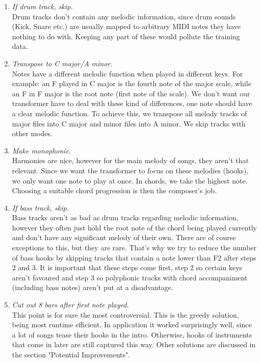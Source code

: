 \documentclass[a4paper,12pt]{extarticle}
\begin{document}
\begin{enumerate}
    \item \textit{If drum track, skip.} \\[0.2cm]
    Drum tracks don't contain any melodic information, since drum sounds (Kick, Snare etc.) are usually mapped to arbitrary MIDI notes they have nothing to do with. Keeping any part of these would pollute the training data.
    
    \item \textit{Transpose to C major/A minor.} \\[0.2cm]
    Notes have a different melodic function when played in different keys. For example: an F played in C major is the fourth note of the major scale, while an F in F major is the root note (first note of the scale). We don't want our transformer have to deal with these kind of differences, one note should have a clear melodic function. To achieve this, we transpose all melody tracks of major files into C major and minor files into A minor. We skip tracks with other modes.
    \item \textit{Make monophonic.} \\[0.2cm]
    Harmonies are nice, however for the main melody of songs, they aren't that relevant. Since we want the transformer to focus on these melodies (hooks), we only want one note to play at once. In chords, we take the highest note. Choosing a suitable chord progression is then the composer's job.
    \item \textit{If bass track, skip.} \\[0.2cm]
    Bass tracks aren't as bad as drum tracks regarding melodic information, however they often just hold the root note of the chord being played currently and don't have any significant melody of their own. There are of course exceptions to this, but they are rare. That's why we try to reduce the number of bass hooks by skipping tracks that contain a note lower than F2 after steps 2 and 3. It is important that these steps come first, step 2 so certain keys aren't favoured and step 3 so polyphonic tracks with chord accompaniment (including bass notes) aren't put at a disadvantage.
    \item \textit{Cut out 8 bars after first note played.} \\[0.2cm]
    This point is for sure the most controversial. This is the greedy solution, being most runtime efficient. In application it worked surprisingly well, since a lot of songs tease their hooks in the intro. Otherwise, hooks of instruments that come in later are still captured this way. Other solutions are discussed in the section "Potential Improvements".

\end{enumerate}
\end{document}
